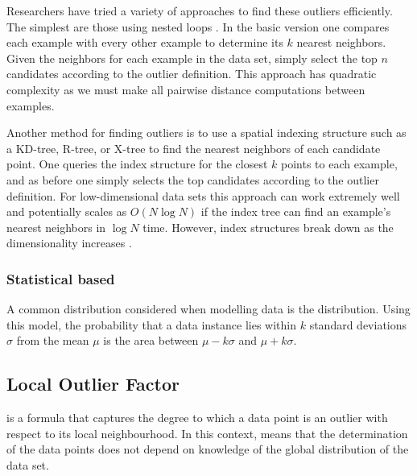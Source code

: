 Researchers have tried a variety of approaches to find these outliers 
efficiently. The simplest are those using nested loops \cite{Bay:2003}. In the 
basic version one compares each example with every other example to determine 
its $k$ nearest neighbors. Given the neighbors for each example in the data set,
simply select the top $n$ candidates according to the outlier definition. This 
approach has quadratic complexity as we must make all pairwise distance 
computations between examples.

Another method for finding outliers is to use a spatial indexing structure such 
as a KD-tree, R-tree, or X-tree to find the nearest neighbors of each candidate 
point. One queries the index structure for the closest $k$ points to each 
example, and as before one simply selects the top candidates according to the 
outlier definition. For low-dimensional data sets this approach can work 
extremely well and potentially scales as $O(N \log N)$ if the index tree can
find an example's nearest neighbors in $\log N$ time. However, index structures 
break down as the dimensionality increases \cite{Bay:2003}.

\subsubsection{Statistical based}
A common distribution considered when modelling data is the 
distribution. Using this model, the probability that a data instance lies within
$k$ standard deviations $\sigma$ from the mean $\mu$ is the area between 
$\mu - k\sigma$ and $\mu + k\sigma$.

\subsection{Local Outlier Factor}
\label{sec:localOutlierFactor}
 is a formula that captures the degree to 
which a data point is an outlier with respect to its local neighbourhood. In 
this context,  means that the determination of the data 
points does not depend on knowledge of the global distribution of the data set.
